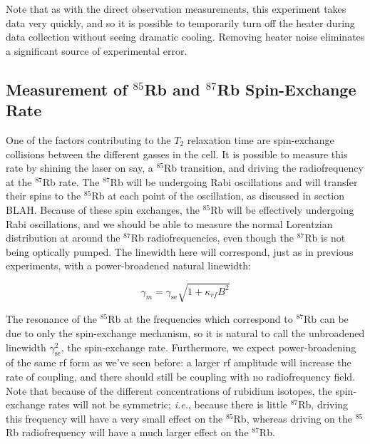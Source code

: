 Note that as with the direct observation measurements, this experiment takes data very quickly, and so it is possible to temporarily turn off the heater during data collection without seeing dramatic cooling. Removing heater noise eliminates a significant source of experimental error.

\subsection{Measurement of $^{85}$Rb and $^{87}$Rb Spin-Exchange Rate}

One of the factors contributing to the $T_{2}$ relaxation time are spin-exchange collisions between the different gasses in the cell. It is possible to measure this rate by shining the laser on say, a $^{85}$Rb transition, and driving the radiofrequency at the $^{87}$Rb rate. The $^{87}$Rb will be undergoing Rabi oscillations and will transfer their spins to the $^{85}$Rb at each point of the oscillation, as discussed in section BLAH. Because of these spin exchanges, the $^{85}$Rb will be effectively undergoing Rabi oscillations, and we should be able to measure the normal Lorentzian distribution at around the $^{87}$Rb radiofrequencies, even though the $^{87}$Rb is not being optically pumped. The linewidth here will correspond, just as in previous experiments, with a power-broadened natural linewidth:

\begin{equation}
\gamma_{m} = \gamma_{\mathrm{se}} \sqrt{1+\kappa_{rf} B^{2}} \label{eq:sebroad}
\end{equation}

The resonance of the $^{85}$Rb at the frequencies which correspond to $^{87}$Rb can be due to only the spin-exchange mechanism, so it is natural to call the unbroadened linewidth $\gamma^2_{\mathrm{se}}$, the spin-exchange rate. Furthermore, we expect power-broadening of the same rf form as we've seen before: a larger rf amplitude will increase the rate of coupling, and there should still be coupling with no radiofrequency field. Note that because of the different concentrations of rubidium isotopes, the spin-exchange rates will not be symmetric; \emph{i.e.}, because there is little  $^{87}$Rb, driving this frequency will have a very small effect on the $^{85}$Rb, whereas driving on the  $^{85}$Rb radiofrequency will have a much larger effect on the  $^{87}$Rb.

